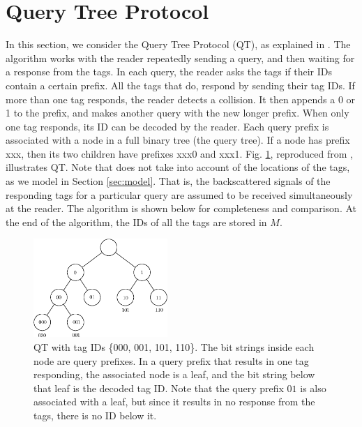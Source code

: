 \documentclass[conference]{IEEEtran}
\begin{document}
\section{Query Tree Protocol}
\label{sec:qt}
In this section, we consider the Query Tree Protocol (QT), as explained in \cite{conf:Law01}.  The algorithm works with the reader repeatedly sending a query, and then waiting for a response from the tags.  In each query, the reader asks the tags if their IDs contain a certain prefix.  All the tags that do, respond by sending their tag IDs.  If more than one tag responds, the reader detects a collision.  It then appends a 0 or 1 to the prefix, and makes another query with the new longer prefix.  When only one tag responds, its ID can be decoded by the reader.  Each query prefix is associated with a node in a full binary tree (the query tree).  If a node has prefix xxx, then its two children have prefixes xxx0 and xxx1.  Fig. \ref{fig:fig2}, reproduced from \cite{conf:Law01}, illustrates QT.  Note that \cite{conf:Law01} does not take into account of the locations of the tags, as we model in Section \ref{sec:model}.  That is, the backscattered signals of the responding tags for a particular query are assumed to be received simultaneously at the reader.  The algorithm is shown below for completeness and comparison.  At the end of the algorithm, the IDs of all the tags are stored in $M$.
\begin{figure}
\centering
\includegraphics[width=2in]{fig2.eps}
\caption{QT with tag IDs \{000, 001, 101, 110\}.  The bit strings inside each node are query prefixes.  In a query prefix that results in one tag responding, the associated node is a leaf, and the bit string below that leaf is the decoded tag ID.  Note that the query prefix $01$ is also associated with a leaf, but since it results in no response from the tags, there is no ID below it.  \label{fig:fig2}}
\end{figure}
\end{document}

